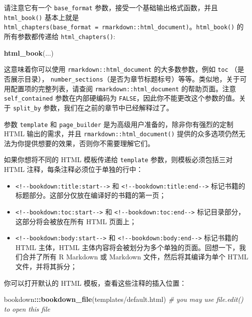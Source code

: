 \documentclass[
  12pt,
]{krantz}
\newenvironment{Shaded}{\begin{snugshade}}{\end{snugshade}}
\newcommand{\CommentTok}[1]{\textcolor[rgb]{0.56,0.35,0.01}{\textit{#1}}}
\newcommand{\FunctionTok}[1]{\textcolor[rgb]{0.13,0.29,0.53}{\textbf{#1}}}
\newcommand{\NormalTok}[1]{#1}
\newcommand{\SpecialCharTok}[1]{\textcolor[rgb]{0.81,0.36,0.00}{\textbf{#1}}}
\newcommand{\StringTok}[1]{\textcolor[rgb]{0.31,0.60,0.02}{#1}}
\providecommand{\tightlist}{%
  \setlength{\itemsep}{0pt}\setlength{\parskip}{0pt}}
\theoremstyle{definition}
\theoremstyle{definition}
\theoremstyle{definition}
\theoremstyle{definition}
\theoremstyle{remark}
\begin{document}
请注意它有一个 \texttt{base\_format} 参数，接受一个基础输出格式函数，并且 \texttt{html\_book()} 基本上就是 \texttt{html\_chapters(base\_format\ =\ rmarkdown::html\_document)}。\texttt{html\_book()} 的所有参数都传递给 \texttt{html\_chapters()}:

\begin{Shaded}
\begin{Highlighting}[]
\FunctionTok{html\_book}\NormalTok{(...)}
\end{Highlighting}
\end{Shaded}

这意味着你可以使用 \texttt{rmarkdown::html\_document} 的大多数参数，例如 \texttt{toc} （是否展示目录）， \texttt{number\_sections}（是否为章节标题标号）等等。类似地，关于可用配置项的完整列表，请查阅 \texttt{rmarkdown::html\_document} 的帮助页面。注意 \texttt{self\_contained} 参数在内部硬编码为 \texttt{FALSE}，因此你不能更改这个参数的值。关于 \texttt{split\_by} 参数，我们在之前的章节中已经解释过了。

参数 \texttt{template} 和 \texttt{page\_builder} 是为高级用户准备的，除非你有强烈的定制 HTML 输出的需求，并且 \texttt{rmarkdown::html\_document()} 提供的众多选项仍然无法为你提供想要的效果，否则你不需要理解它们。

如果你想将不同的 HTML 模板传递给 \texttt{template} 参数，则模板必须包括三对 HTML 注释，每条注释必须位于单独的行中：

\begin{itemize}
\tightlist
\item
  \texttt{\textless{}!-\/-bookdown:title:start-\/-\textgreater{}} 和 \texttt{\textless{}!-\/-bookdown:title:end-\/-\textgreater{}} 标记书籍的标题部分。这部分仅放在编译好的书籍的第一页；
\item
  \texttt{\textless{}!-\/-bookdown:toc:start-\/-\textgreater{}} 和 \texttt{\textless{}!-\/-bookdown:toc:end-\/-\textgreater{}} 标记目录部分，这部分将会被放在所有 HTML 页面上；
\item
  \texttt{\textless{}!-\/-bookdown:body:start-\/-\textgreater{}} 和 \texttt{\textless{}!-\/-bookdown:body:end-\/-\textgreater{}} 标记书籍的 HTML 主体，HTML 主体内容将会被划分为多个单独的页面。回想一下，我们合并了所有 R Markdown 或 Markdown 文件，然后将其编译为单个 HTML 文件，并将其拆分；
\end{itemize}

你可以打开默认的 HTML 模板，查看这些注释的插入位置：

\begin{Shaded}
\begin{Highlighting}[]
\NormalTok{bookdown}\SpecialCharTok{:::}\FunctionTok{bookdown\_file}\NormalTok{(}\StringTok{\textquotesingle{}templates/default.html\textquotesingle{}}\NormalTok{)}
\CommentTok{\# you may use file.edit() to open this file}
\end{Highlighting}
\end{Shaded}
\end{document}
